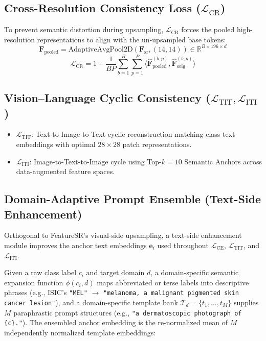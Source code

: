 \documentclass[conference]{IEEEtran}
\begin{document}
\subsection{Cross-Resolution Consistency Loss ($\mathcal{L}_{\text{CR}}$)}
To prevent semantic distortion during upsampling, $\mathcal{L}_{\text{CR}}$ forces the pooled high-resolution representations to align with the un-upsampled base tokens:
\[ \mathbf{F}_{\text{pooled}} = \text{AdaptiveAvgPool2D}(\mathbf{F}_{\text{sr}}, (14,14)) \in \mathbb{R}^{B \times 196 \times d} \]
\[ \mathcal{L}_{\text{CR}} = 1 - \frac{1}{B P} \sum_{b=1}^{B}\sum_{p=1}^{P} \big\langle \hat{\mathbf{F}}_{\text{pooled}}^{(b,p)}, \hat{\mathbf{F}}_{\text{orig}}^{(b,p)} \big\rangle \]

\subsection{Vision--Language Cyclic Consistency ($\mathcal{L}_{\text{TIT}}, \mathcal{L}_{\text{ITI}}$)}
\begin{itemize}
\item $\mathcal{L}_{\text{TIT}}$: Text-to-Image-to-Text cyclic reconstruction matching class text embeddings with optimal $28\times28$ patch representations.
\item $\mathcal{L}_{\text{ITI}}$: Image-to-Text-to-Image cycle using Top-$k{=}10$ Semantic Anchors across data-augmented feature spaces.
\end{itemize}

\subsection{Domain-Adaptive Prompt Ensemble (Text-Side Enhancement)} \label{sec:promptensemble}

Orthogonal to FeatureSR's visual-side upsampling, a text-side enhancement module improves the anchor text embeddings $\mathbf{e}_i$ used throughout $\mathcal{L}_{\text{CE}}$, $\mathcal{L}_{\text{TIT}}$, and $\mathcal{L}_{\text{ITI}}$.

Given a raw class label $c_i$ and target domain $d$, a domain-specific semantic expansion function $\phi(c_i,d)$ maps abbreviated or terse labels into descriptive phrases (e.g., ISIC's \texttt{"MEL"} $\rightarrow$ \texttt{"melanoma, a malignant pigmented skin cancer lesion"}), and a domain-specific template bank $\mathcal{T}_d = \{t_1,\dots,t_M\}$ supplies $M$ paraphrastic prompt structures (e.g., \texttt{"a dermatoscopic photograph of \{c\}."}). The ensembled anchor embedding is the re-normalized mean of $M$ independently normalized template embeddings:
\end{document}
